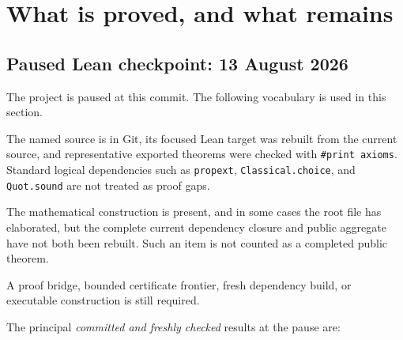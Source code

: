 \documentclass[11pt,a4paper,oneside]{article}
\newcommand{\lean}[1]{\nolinkurl{#1}}
\begin{document}
\section{What is proved, and what remains}

\subsection{Paused Lean checkpoint: 13 August 2026}

The project is paused at this commit.  The following vocabulary is used in
this section.

\begin{description}[style=nextline,leftmargin=3.4cm]
\item[Committed and kernel-checked]
  The named source is in Git, its focused Lean target was rebuilt from the
  current source, and representative exported theorems were checked with
  \texttt{\#print axioms}.  Standard logical dependencies such as
  \lean{propext}, \lean{Classical.choice}, and \lean{Quot.sound} are not
  treated as proof gaps.
\item[Source or local-build checkpoint]
  The mathematical construction is present, and in some cases the root file
  has elaborated, but the complete current dependency closure and public
  aggregate have not both been rebuilt.  Such an item is not counted as a
  completed public theorem.
\item[Open]
  A proof bridge, bounded certificate frontier, fresh dependency build, or
  executable construction is still required.
\end{description}

The principal \emph{committed and freshly checked} results at the pause are:
\end{document}
